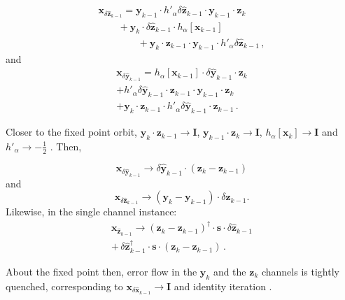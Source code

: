 \documentclass[letterpaper,twocolumn,amsmath,amsfont,amssymb,english,aps,jcp,preprintnumbers,groupaddress,nofootinbib,tightenlines,floatfix]{revtex4}
\newcommand{\mat}[1]{\boldsymbol{#1}}
\theoremstyle{plain}
\theoremstyle{remark}
\theoremstyle{plain}
\begin{document}
\begin{multline}\label{dxdy}
 \mat{x}_{\delta \widehat{ \mat{z}}_{k-1}} =  {\mat{y}}_{k-1} \cdot  h'_\alpha \delta \widehat{ \mat{z}}_{k-1} \cdot  \mat{y}_{k-1}  \cdot \mat{z}_{k} \\
\qquad + \mat{y}_k \cdot  \delta \widehat{\mat{z}}_{k-1} \cdot   h_\alpha \left[ \mat{x}_{k-1} \right] \\
\qquad \qquad +  \mat{y}_{k} \cdot  \mat{z}_{k-1} \cdot {\mat{y}}_{k-1} \cdot h'_\alpha \delta \widehat{\mat{z}}_{k-1} \, ,
\end{multline}
and 
\begin{multline}\label{dxdz}
  \mat{x}_{\delta \widehat{ \mat{y}}_{k-1}} = h_\alpha \left[ \mat{x}_{k-1} \right]  \cdot \delta \widehat{\mat{y}}_{k-1} \cdot \mat{z}_{k} \\
+  h'_\alpha  \delta \widehat{\mat{y}}_{k-1} \cdot \mat{z}_{k-1} \cdot  \mat{y}_{k-1} \cdot  \mat{z}_{k} \\
 + \mat{y}_{k} \cdot \mat{z}_{k-1} \cdot h'_\alpha \delta \widehat{\mat{y}}_{k-1} \cdot \mat{z}_{k-1}  \, .
\end{multline}


Closer to the fixed point orbit,  $\mat{y}_k \cdot \mat{z}_{k-1} \rightarrow \mat{I}$, $\mat{y}_{k-1} \cdot \mat{z}_{k} \rightarrow \mat{I}$,
$h_\alpha \left[ \mat{x}_{k} \right] \rightarrow \mat{I}$ and $h'_\alpha \rightarrow - \frac{1}{2}$ \cite{higham2005}.  Then,

\begin{equation} \label{yorbit}
 \mat{x}_{\delta \widehat{ \mat{y}}_{k-1}} \rightarrow \delta \widehat{\mat{y}}_{k-1} \cdot \left( \mat{z}_k-\mat{z}_{k-1} \right)
\end{equation}
and
\begin{equation} \label{zorbit}
 \mat{x}_{\delta \widehat{ \mat{z}}_{k-1}} \rightarrow \left( \mat{y}_k-\mat{y}_{k-1} \right) \cdot \delta \widehat{\mat{z}}_{k-1} .
\end{equation}
Likewise, in the single channel instance:
\begin{multline}
 \mat{x}_{\widehat{\mat{z}}_{k-1}} \rightarrow  \left(  \mat{z}_{k} - \mat{z}_{k-1} \right)^\dagger \cdot \mat{s} \cdot \delta \widehat{\mat{z}}_{k-1} \\
+  \, \delta \widehat{\mat{z}}^\dagger_{k-1} \cdot  \mat{s}  \cdot \left(  \mat{z}_{k} - \mat{z}_{k-1} \right)  \, .
\end{multline}

About the fixed point then, error flow in the $\mat{y}_k$ and the $\mat{z}_k$ channels is tightly quenched,
corresponding to $\mat{x}_{\delta \widehat{\mat{x}}_{k-1}} \rightarrow  \mat{I}$  and identity iteration \cite{higham2005}.
\end{document}
